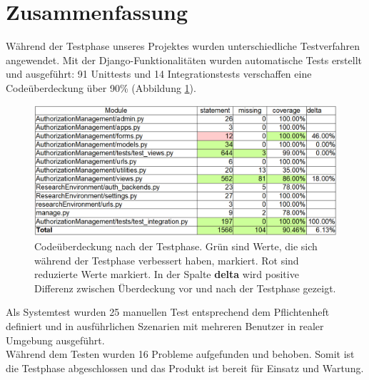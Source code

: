 \documentclass[parskip=full,11pt]{scrartcl}
\begin{document}
\begin{itemize}
\end{itemize}   

\newpage
\section{Zusammenfassung} \label{zusammenfassung}
Während der Testphase unseres Projektes wurden unterschiedliche Testverfahren angewendet. Mit der Django-Funktionalitäten wurden automatische Tests erstellt und ausgeführt: 91 Unittests und 14 Integrationstests verschaffen eine Codeüberdeckung über 90\% (Abbildung \ref{coverage}). \\

 \begin{figure}[ht!]
 	\centering
 	\includegraphics[width=1\textwidth]{res/coverage_after.png}
 	\caption{Codeüberdeckung nach der Testphase. Grün sind Werte, die sich während der Testphase verbessert haben, markiert. Rot sind reduzierte Werte markiert. In der Spalte \textbf{delta} wird positive Differenz zwischen Überdeckung vor und nach der Testphase gezeigt.}
\label{coverage}
 \end{figure}
 Als Systemtest wurden 25 manuellen Test entsprechend dem Pflichtenheft definiert und in ausführlichen Szenarien mit mehreren Benutzer in realer Umgebung ausgeführt.\\
Während dem Testen wurden 16 Probleme aufgefunden und behoben. Somit ist die Testphase abgeschlossen und das Produkt ist bereit für Einsatz und Wartung. 
\end{document}
